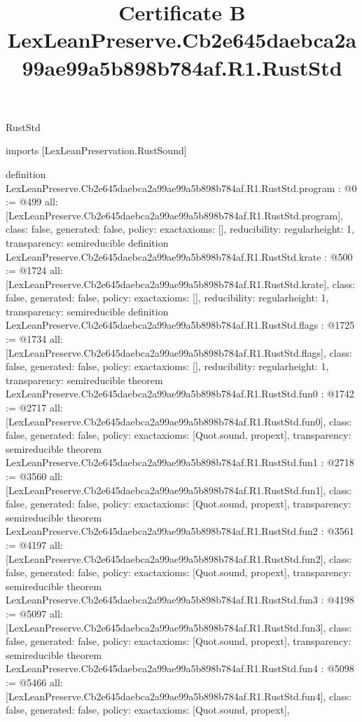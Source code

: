 \begin{lexlean}{RustStd}
\title{Certificate B LexLeanPreserve.Cb2e645daebca2a99ae99a5b898b784af.R1.RustStd}
\begin{coremodule}
imports [LexLeanPreservation.RustSound]

definition LexLeanPreserve.Cb2e645daebca2a99ae99a5b898b784af.R1.RustStd.program : @0 := @499 {
  all: [LexLeanPreserve.Cb2e645daebca2a99ae99a5b898b784af.R1.RustStd.program],
  class: false,
  generated: false,
  policy: exact{axioms: []},
  reducibility: regular{height: 1},
  transparency: semireducible
}
definition LexLeanPreserve.Cb2e645daebca2a99ae99a5b898b784af.R1.RustStd.krate : @500 := @1724 {
  all: [LexLeanPreserve.Cb2e645daebca2a99ae99a5b898b784af.R1.RustStd.krate],
  class: false,
  generated: false,
  policy: exact{axioms: []},
  reducibility: regular{height: 1},
  transparency: semireducible
}
definition LexLeanPreserve.Cb2e645daebca2a99ae99a5b898b784af.R1.RustStd.flags : @1725 := @1734 {
  all: [LexLeanPreserve.Cb2e645daebca2a99ae99a5b898b784af.R1.RustStd.flags],
  class: false,
  generated: false,
  policy: exact{axioms: []},
  reducibility: regular{height: 1},
  transparency: semireducible
}
theorem LexLeanPreserve.Cb2e645daebca2a99ae99a5b898b784af.R1.RustStd.fun0 : @1742 := @2717 {
  all: [LexLeanPreserve.Cb2e645daebca2a99ae99a5b898b784af.R1.RustStd.fun0],
  class: false,
  generated: false,
  policy: exact{axioms: [Quot.sound, propext]},
  transparency: semireducible
}
theorem LexLeanPreserve.Cb2e645daebca2a99ae99a5b898b784af.R1.RustStd.fun1 : @2718 := @3560 {
  all: [LexLeanPreserve.Cb2e645daebca2a99ae99a5b898b784af.R1.RustStd.fun1],
  class: false,
  generated: false,
  policy: exact{axioms: [Quot.sound, propext]},
  transparency: semireducible
}
theorem LexLeanPreserve.Cb2e645daebca2a99ae99a5b898b784af.R1.RustStd.fun2 : @3561 := @4197 {
  all: [LexLeanPreserve.Cb2e645daebca2a99ae99a5b898b784af.R1.RustStd.fun2],
  class: false,
  generated: false,
  policy: exact{axioms: [Quot.sound, propext]},
  transparency: semireducible
}
theorem LexLeanPreserve.Cb2e645daebca2a99ae99a5b898b784af.R1.RustStd.fun3 : @4198 := @5097 {
  all: [LexLeanPreserve.Cb2e645daebca2a99ae99a5b898b784af.R1.RustStd.fun3],
  class: false,
  generated: false,
  policy: exact{axioms: [Quot.sound, propext]},
  transparency: semireducible
}
theorem LexLeanPreserve.Cb2e645daebca2a99ae99a5b898b784af.R1.RustStd.fun4 : @5098 := @5466 {
  all: [LexLeanPreserve.Cb2e645daebca2a99ae99a5b898b784af.R1.RustStd.fun4],
  class: false,
  generated: false,
  policy: exact{axioms: [Quot.sound, propext]},
}
\end{coremodule}
\end{lexlean}
